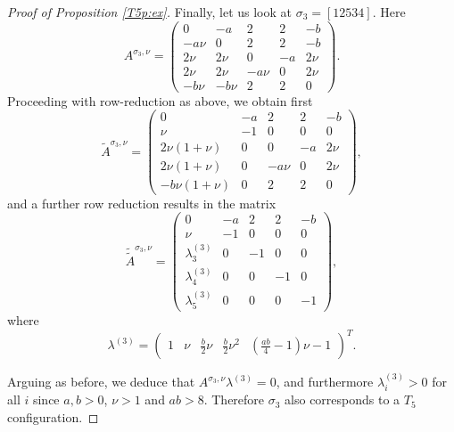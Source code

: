 \documentclass[titlepage]{amsart}
\numberwithin{equation}{section}
\theoremstyle{plain}
\theoremstyle{definition}
\theoremstyle{remark}
\begin{document}
\begin{proof}[Proof of Proposition \ref{T5p:ex}]
Finally, let us look at $\sigma_3=[1 2 5 3 4]$. Here
$$
A^{\sigma_3,\nu}=\begin{pmatrix}
	0&-a&2&2&-b\\ -a\nu &0&2&2&-b \\ 2\nu &2\nu &0&-a&2\nu\\ 2\nu &2\nu &-a\nu &0&2\nu\\-b\nu &-b\nu &2 &2 &0
\end{pmatrix}.	
$$ 
Proceeding with row-reduction as above, we obtain first
$$
\tilde A^{\sigma_3,\nu}=\begin{pmatrix}
	0&-a&2&2&-b\\ 
	\nu &-1&0&0&0\\ 
	2\nu(1+\nu) &0&0&-a&2\nu\\ 
	2\nu(1+\nu) &0&-a\nu &0&2\nu\\
	-b\nu(1+\nu) &0 &2 &2 &0
\end{pmatrix},
$$ 
and a further row reduction results in the matrix
$$
  \tilde{\tilde A}^{\sigma_3, \nu} 
=
\begin{pmatrix}   	0&-a&2&2&-b\\ 
	\nu &-1&0&0&0\\ 
	\lambda^{(3)}_3 &0&-1&0&0\\ 
	\lambda^{(3)}_4 &0&0&-1&0\\
	\lambda^{(3)}_5 &0 &0&0&-1
\end{pmatrix},
$$ 
where
$$
\lambda^{(3)}=\begin{pmatrix}1&\nu &\tfrac{b}{2}\nu &\tfrac{b}{2}\nu^2&\left(\frac{ab}{4}-1\right)\nu-1\end{pmatrix}^T.
$$

Arguing as before, we deduce that $A^{\sigma_3,\nu}\lambda^{(3)}=0$, and furthermore $\lambda^{(3)}_i>0$ for all $i$ since $a,b>0$, $\nu>1$ and $ab>8$. Therefore $\sigma_3$ also corresponds to a $T_5$ configuration.

\bigskip







\end{proof}
\end{document}
